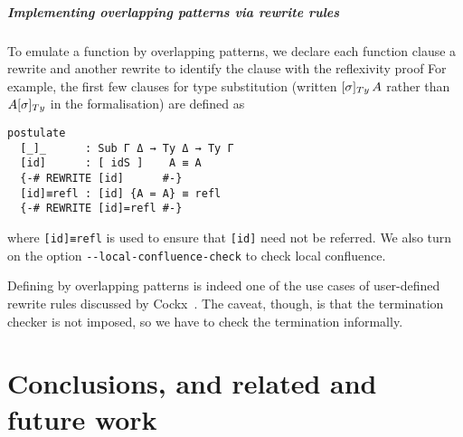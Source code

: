 \documentclass[a4paper,UKenglish,numberwithinsect,cleveref,thm-restate]{lipics-v2021}
\newcommand{\LT}[2][]{\todo[inline,author={L-T},caption={},color={pink},#1]{#2}}
\begin{document}
\subparagraph*{Implementing overlapping patterns via rewrite rules}
To emulate a function by overlapping patterns, we declare each function clause a rewrite and another rewrite to identify the clause with the reflexivity proof
For example, the first few clauses for type substitution (written $[\sigma]_{\Ty}\,A$ rather than $\subTy{A}{\sigma}$ in the formalisation) are defined as
\begin{lstlisting}
postulate
  [_]_      : Sub Γ Δ → Ty Δ → Ty Γ
  [id]      : [ idS ]    A ≡ A
  {-# REWRITE [id]      #-}
  [id]≡refl : [id] {A = A} ≡ refl
  {-# REWRITE [id]=refl #-}
\end{lstlisting}
where \lstinline|[id]≡refl| is used to ensure that \lstinline|[id]| need not be referred.
We also turn on the option \texttt{-{}-local-confluence-check} to check local confluence.


Defining by overlapping patterns is indeed one of the use cases of user-defined rewrite rules discussed by Cockx~\cite{Cockx2020}. 
The caveat, though, is that the termination checker is not imposed, so we have to check the termination informally.

%
% 
%

\section{Conclusions, and related and future work}\label{sec:conclusion}
\end{document}
